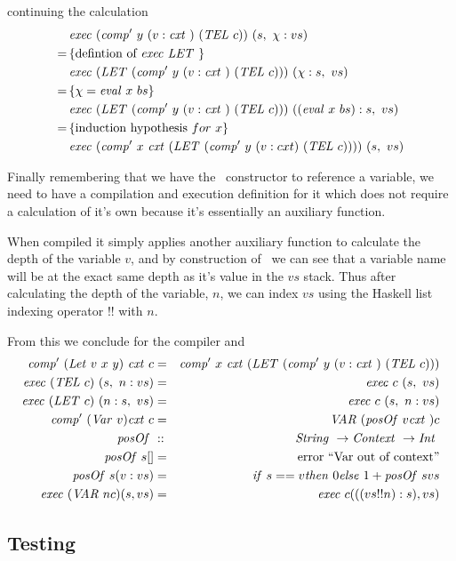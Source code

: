 \documentclass {article}
\begin{document}
continuing the calculation
\begin{align*}
&\Exec (\Compp  y\ (v:\cxtm)\ (\TEL c))\ (s,\ \chi : vs) \\
=\, & \{\mbox{defintion of}\ \Exec \LET \} \\
&\Exec (\LET (\Compp  y\ (v:\cxtm)\ (\TEL c)))\ (\chi : s,\ vs)\\
=\, & \{ \chi = \evalf  x\ bs \} \\
&\Exec (\LET (\Compp  y\ (v:\cxtm)\ (\TEL c)))\ ((\evalf  x\ bs) : s,\ vs)\\
=\, & \{ \mbox{induction hypothesis}\ for\ x \} \\
&\Exec (\Compp  x\ \cxtm (\LET (\Compp  y\ (v:cxt)\ (\TEL c))))\ (s,\ vs)
\end{align*}

Finally remembering that we have the \var\ constructor to
reference a variable, we need to have a compilation and execution
definition for it which does not require a calculation of it's
own because it's essentially an auxiliary function.

When compiled it simply applies another auxiliary function
to calculate the depth of the variable $v$, 
and by construction of \leet\
we can see that a variable name will be at the exact same depth
as it's value in the $vs$ stack.
Thus after calculating the depth of the variable, $n$,
 we can index $vs$ using
the Haskell list indexing operator !! with $n$.

\newcommand{\posOf}{\mathit{posOf\ }}
From this we conclude for the compiler and \vm
\begin{eqnarray*}
\Compp  (\Let v\ x\ y)\ \cxtm c
		&=& \Compp  x\ \cxtm (\LET (\Compp  y\ (v:\cxtm)\ (\TEL c))) \\
\Exec (\TEL c)\ (s,\ n:vs) &=& \Exec c\ (s,\ vs) \\
\Exec (\LET c)\ (n:s,\ vs) &=& \Exec c\ (s,\ n:vs) \\
\Compp (\Var v) \cxtm c    &=&   \VAR (\posOf v \cxtm) c \\
\posOf &::& \String \rightarrow \Context \rightarrow \Int \\
\posOf s [] &=& \mbox{error ``Var out of context''} \\
\posOf s (v:vs) &=& \ifff s == v \tthen 0 \eelse 1 + \posOf s vs  \\
\Exec (\VAR n c)  ( s, vs)       &=&   \Exec c (((vs!!n):s), vs) \\
\end{eqnarray*}


\subsection{Testing}
\end{document}
